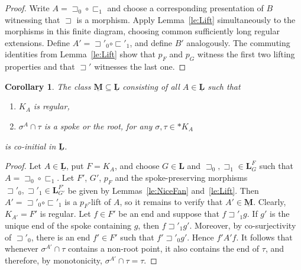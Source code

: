 \documentclass[12pt]{amsart}
\numberwithin{equation}{section}
\theoremstyle{plain}
\newtheorem{corollary}[theorem]{\bf Corollary}
\theoremstyle{definition}
\newcommand \sqsp{\sqsupset}
\newcommand \sqsb{\sqsubset}
\newcommand \LLb{\mathbf{L}}
\newcommand \LLub{\underline{\mathbf{L}}}
\newcommand \MMub{\underline{\mathbf{M}}}
\begin{document}
\begin{proof}
Write $A=\sqsp_0\circ\sqsb_1$
and choose a corresponding presentation of $B$ witnessing that
$\sqsp$ is a morphism. Apply Lemma~\ref{le:Lift} simultaneously to
the morphisms in this finite diagram, choosing common sufficiently
long regular extensions. Define $A'=\sqsp'_0\circ\sqsb'_1$, and define $B'$ analogously. The commuting identities from
Lemma~\ref{le:Lift} show that $p_F$ and $p_G$ witness the first two
lifting properties and that $\sqsp'$ witnesses the last one.
\end{proof}

\begin{corollary}
	\label{co:BranchesonBanchesCoinitial}
	The class $\MMub \subseteq \LLub$ consisting of all $A \in\LLub$ such that
	\begin{enumerate}
		\item $K_A$ is regular, 
		\item $\sigma^A \cap \tau$ is a spoke or the root, for any $\sigma, \tau \in *K_A$
	\end{enumerate}
	is co-initial in $\LLub$.
\end{corollary}


\begin{proof}
	Let $A\in\LLub$, put $F=K_A$, and choose $G\in\LLb$ and
	$\sqsp_0,\sqsp_1\in\LLb^F_G$ such that $A=\sqsp_0\circ\sqsb_1$.
	Let $F'$, $G'$, $p_F$ and the spoke-preserving morphisms $\sqsp'_0,\sqsp'_1\in\LLb^{F'}_{G'}$ be given by Lemmas~\ref{le:NiceFan} and~\ref{le:Lift}. Then $A'=\sqsp'_0\circ\sqsb'_1$ is a $p_F$-lift of $A$, so it remains to verify that $A'\in\MMub$.
	Clearly, $K_{A'}=F'$ is regular. Let $f\in F'$ be an end and suppose that $f\sqsp'_1 g$. If $g'$ is the unique end of the spoke containing $g$, then $f\sqsp'_1 g'$. Moreover, by co-surjectivity of $\sqsp'_0$, there is an end $f'\in F'$ such that $f'\sqsp'_0 g'$. Hence $f'A'f$. It follows that whenever $\sigma^{A'}\cap\tau$ contains a non-root point, it also contains the end of $\tau$, and therefore, by monotonicity, $\sigma^{A'}\cap\tau=\tau$.
\end{proof}
\end{document}
